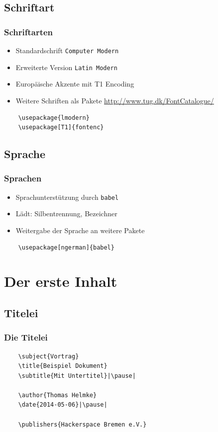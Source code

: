 \documentclass[svgnames]{beamer}
\begin{document}
\subsection{Schriftart}
\begin{frame}[fragile] %
	\frametitle{Schriftarten} %
	\begin{itemize}
		\item Standardschrift \lstinline|Computer Modern|\pause
		\item Erweiterte Version \lstinline|Latin Modern|\pause
		\item Europäische Akzente mit T1 Encoding\pause
		\item Weitere Schriften als Pakete \url{http://www.tug.dk/FontCatalogue/}\pause
	\end{itemize}
	\vspace*{\baselineskip}
	\begin{lstlisting}
	\usepackage{lmodern}
	\usepackage[T1]{fontenc}
	\end{lstlisting}
\end{frame}
\subsection{Sprache}
\begin{frame}[fragile] %
	\frametitle{Sprachen} %
	\begin{itemize}
		\item Sprachunterstützung durch \lstinline|babel|\pause
		\item Lädt: Silbentrennung, Bezeichner\pause
		\item Weitergabe der Sprache an weitere Pakete\pause
	\end{itemize}
	\vspace*{\baselineskip}
	\begin{lstlisting}
	\usepackage[ngerman]{babel}
	\end{lstlisting}
\end{frame}

\section{Der erste Inhalt}
\subsection{Titelei}
\begin{frame}[fragile] %
	\frametitle{Die Titelei} %
	\begin{lstlisting}
	\subject{Vortrag}
	\title{Beispiel Dokument}
	\subtitle{Mit Untertitel}|\pause|
	
	\author{Thomas Helmke}
	\date{2014-05-06}|\pause|
	
	\publishers{Hackerspace Bremen e.V.}
	\end{lstlisting}
\end{frame}
\end{document}
